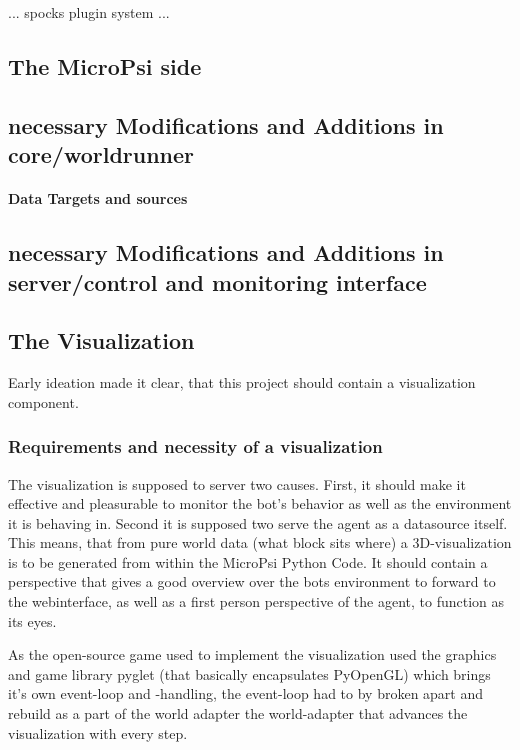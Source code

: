 

... spocks plugin system ...


\subsection{The MicroPsi side}

\subsection{necessary Modifications and Additions in core/worldrunner}

\paragraph{Data Targets and sources}

\subsection{necessary Modifications and Additions in server/control and monitoring interface}

\subsection{The Visualization}
Early ideation made it clear, that this project should contain a visualization component. 

\subsubsection{Requirements and necessity of a visualization}
The visualization is supposed to server two causes. First, it should make it effective and pleasurable to monitor the bot's behavior as well as the environment it is behaving in. Second it is supposed two serve the agent as a datasource itself. This means, that from pure world data (what block sits where) a 3D-visualization is to be generated from within the MicroPsi Python Code. It should contain a perspective that gives a good overview over the bots environment to forward to the webinterface, as well as a first person perspective of the agent, to function as its eyes.

As the open-source game used to implement the visualization used the graphics and game library pyglet (that basically encapsulates PyOpenGL) which brings it's own event-loop and -handling, the event-loop had to by broken apart and rebuild as a part of the world adapter the world-adapter that advances the visualization with every step.

